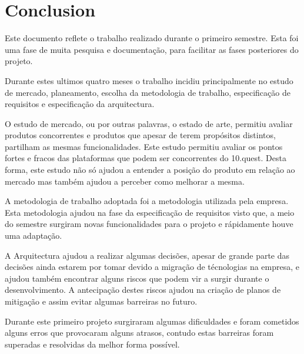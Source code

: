\chapter{Conclusion}
\label{sec:conclusion}


Este documento reflete o trabalho realizado durante o primeiro semestre. Esta foi uma fase de muita pesquisa e documentação, para facilitar as fases posteriores do projeto. 

Durante estes ultimos quatro meses o trabalho incidiu principalmente no estudo de mercado, planeamento, escolha da metodologia de trabalho, especificação de requisitos e especificação da arquitectura.

O estudo de mercado, ou por outras palavras, o estado de arte, permitiu avaliar produtos concorrentes e produtos que apesar de terem propósitos distintos, partilham as mesmas funcionalidades. Este estudo permitiu avaliar os pontos fortes e fracos das plataformas que podem ser concorrentes do 10.quest. Desta forma, este estudo não só ajudou a entender a posição do produto em relação ao mercado mas também ajudou a perceber como melhorar a mesma.

A metodologia de trabalho adoptada foi a metodologia utilizada pela empresa. Esta metodologia ajudou na fase da especificação de requisitos visto que, a meio do semestre surgiram novas funcionalidades para o projeto e rápidamente houve uma adaptação.

A Arquitectura ajudou a realizar algumas decisões, apesar de grande parte das decisões ainda estarem por tomar devido a migração de técnologias na empresa, e ajudou também encontrar alguns riscos que podem vir a surgir durante o desenvolvimento. A antecipação destes riscos ajudou na criação de planos de mitigação e assim evitar algumas barreiras no futuro. 

Durante este primeiro projeto surgiraram algumas dificuldades e foram cometidos alguns erros que provocaram alguns atrasos, contudo estas barreiras foram superadas e resolvidas da melhor forma possível. 




\blankpage

\glsresetall
